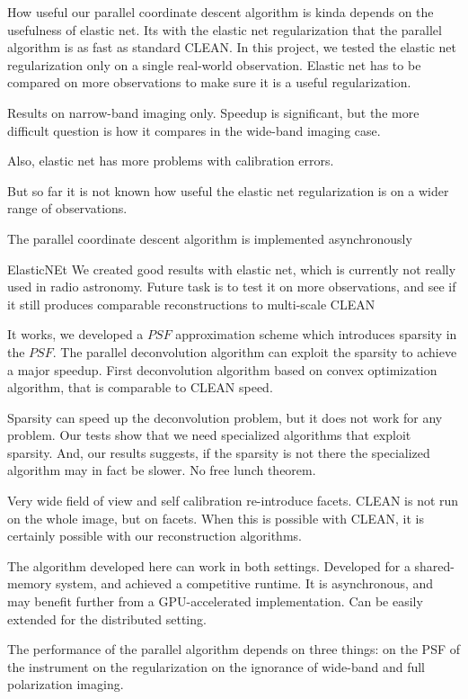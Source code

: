 How useful our parallel coordinate descent algorithm is kinda depends on the usefulness of elastic net. Its with the elastic net regularization that the parallel algorithm is as fast as standard CLEAN. In this project, we tested the elastic net regularization only on a single real-world observation.
Elastic net has to be compared on more observations to make sure it is a useful regularization.


Results on narrow-band imaging only. Speedup is significant, but the more difficult question is how it compares in the wide-band imaging case.




Also, elastic net has more problems with calibration errors. 

But so far it is not known how useful the elastic net regularization is on a wider range of observations.




The parallel coordinate descent algorithm is implemented asynchronously


ElasticNEt
We created good results with elastic net, which is currently not really used in radio astronomy. Future task is to test it on more observations, and see if it still produces comparable reconstructions to multi-scale CLEAN

It works, we developed a $PSF$ approximation scheme which introduces sparsity in the $PSF$. The parallel deconvolution algorithm can exploit the sparsity to achieve a major speedup.
First deconvolution algorithm based on convex optimization algorithm, that is comparable to CLEAN speed.

Sparsity can speed up the deconvolution problem, but it does not work for any problem. Our tests show that we need specialized algorithms that exploit sparsity. And, our results suggests, if the sparsity is not there the specialized algorithm may in fact be slower. No free lunch theorem.

Very wide field of view and self calibration re-introduce facets. CLEAN is not run on the whole image, but on facets. When this is possible with CLEAN, it is certainly possible with our reconstruction algorithms.

The algorithm developed here can work in both settings. Developed for a shared-memory system, and achieved a competitive runtime. It is asynchronous, and may benefit further from a GPU-accelerated implementation. Can be easily extended for the distributed setting.


The performance of the parallel algorithm depends on three things:
  on the PSF of the instrument
  on the regularization
  on the ignorance of wide-band and full polarization imaging.

